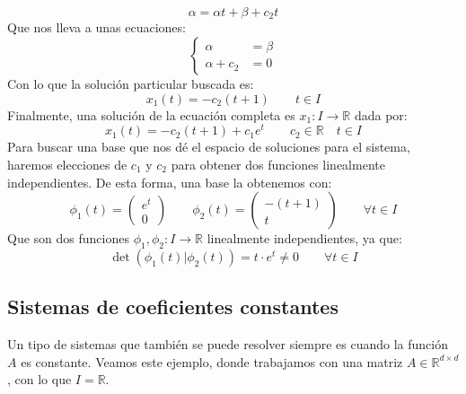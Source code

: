 \begin{ejemplo}
\begin{equation*}
        \alpha = \alpha t + \beta + c_2 t
    \end{equation*}
    Que nos lleva a unas ecuaciones:
    \begin{equation*}
        \left\{\begin{array}{rl}
                \alpha &= \beta \\
                \alpha + c_2 &= 0
        \end{array}\right. 
    \end{equation*}
    Con lo que la solución particular buscada es:
    \begin{equation*}
        x_1(t) = -c_2(t+1) \qquad t\in I
    \end{equation*}
    Finalmente, una solución de la ecuación completa es $x_1:I\rightarrow\mathbb{R}$ dada por:
    \begin{equation*}
        x_1(t) = -c_2(t+1) + c_1 e^t \qquad c_2\in \mathbb{R} \quad  t\in I
    \end{equation*}
    Para buscar una base que nos dé el espacio de soluciones para el sistema, haremos elecciones de $c_1$ y $c_2$ para obtener dos funciones linealmente independientes. De esta forma, una base la obtenemos con:
    \begin{equation*}
        \phi_1(t) = \left(\begin{array}{c}
            e^t \\
            0
        \end{array}\right) \qquad 
        \phi_2(t) = \left(\begin{array}{c}
            -(t+1) \\
            t
        \end{array}\right) \qquad \forall t\in I
    \end{equation*}
    Que son dos funciones $\phi_1,\phi_2:I\rightarrow\mathbb{R}$ linealmente independientes, ya que:
    \begin{equation*}
        \det(\phi_1(t)|\phi_2(t)) = t\cdot e^t \neq 0 \qquad \forall t\in I
    \end{equation*}
\end{ejemplo}

\subsection{Sistemas de coeficientes constantes}
\noindent
Un tipo de sistemas que también se puede resolver siempre es cuando la función $A$ es constante. Veamos este ejemplo, donde trabajamos con una matriz $A\in \mathbb{R}^{d\times d}$, con lo que $I=\mathbb{R}$.\\


